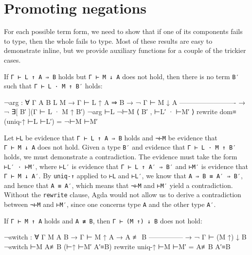 \hypertarget{promoting-negations}{%
\section{Promoting negations}\label{promoting-negations}}

For each possible term form, we need to show that if one of its
components fails to type, then the whole fails to type. Most of these
results are easy to demonstrate inline, but we provide auxiliary
functions for a couple of the trickier cases.

If \texttt{Γ\ ⊢\ L\ ↑\ A\ ⇒\ B} holds but \texttt{Γ\ ⊢\ M\ ↓\ A} does
not hold, then there is no term \texttt{B′} such that
\texttt{Γ\ ⊢\ L\ ·\ M\ ↑\ B′} holds:

\begin{fence}
\begin{code}
¬arg : ∀ {Γ A B L M}
  → Γ ⊢ L ↑ A ⇒ B
  → ¬ Γ ⊢ M ↓ A
    -------------------------
  → ¬ ∃[ B′ ](Γ ⊢ L · M ↑ B′)
¬arg ⊢L ¬⊢M ⟨ B′ , ⊢L′ · ⊢M′ ⟩ rewrite dom≡ (uniq-↑ ⊢L ⊢L′) = ¬⊢M ⊢M′
\end{code}
\end{fence}

Let \texttt{⊢L} be evidence that \texttt{Γ\ ⊢\ L\ ↑\ A\ ⇒\ B} holds and
\texttt{¬⊢M} be evidence that \texttt{Γ\ ⊢\ M\ ↓\ A} does not hold.
Given a type \texttt{B′} and evidence that \texttt{Γ\ ⊢\ L\ ·\ M\ ↑\ B′}
holds, we must demonstrate a contradiction. The evidence must take the
form \texttt{⊢L′\ ·\ ⊢M′}, where \texttt{⊢L′} is evidence that
\texttt{Γ\ ⊢\ L\ ↑\ A′\ ⇒\ B′} and \texttt{⊢M′} is evidence that
\texttt{Γ\ ⊢\ M\ ↓\ A′}. By \texttt{uniq-↑} applied to \texttt{⊢L} and
\texttt{⊢L′}, we know that \texttt{A\ ⇒\ B\ ≡\ A′\ ⇒\ B′}, and hence
that \texttt{A\ ≡\ A′}, which means that \texttt{¬⊢M} and \texttt{⊢M′}
yield a contradiction. Without the \texttt{rewrite} clause, Agda would
not allow us to derive a contradiction between \texttt{¬⊢M} and
\texttt{⊢M′}, since one concerns type \texttt{A} and the other type
\texttt{A′}.

If \texttt{Γ\ ⊢\ M\ ↑\ A} holds and \texttt{A\ ≢\ B}, then
\texttt{Γ\ ⊢\ (M\ ↑)\ ↓\ B} does not hold:

\begin{fence}
\begin{code}
¬switch : ∀ {Γ M A B}
  → Γ ⊢ M ↑ A
  → A ≢ B
    ---------------
  → ¬ Γ ⊢ (M ↑) ↓ B
¬switch ⊢M A≢B (⊢↑ ⊢M′ A′≡B) rewrite uniq-↑ ⊢M ⊢M′ = A≢B A′≡B
\end{code}
\end{fence}

